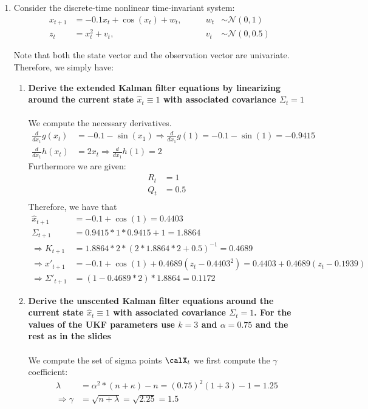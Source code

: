 \documentclass{article}
\begin{document}
\begin{enumerate}
\begin{enumerate}
    \end{enumerate}

  \item  Consider the discrete-time nonlinear time-invariant system:
  \begin{align*}
  x_{t+1} &= -0.1 x_t + \cos(x_t) + w_t, \qquad &w_t& \sim \mathcal{N}(0,1)\\
   z_t &= x_t^2 + v_t, \qquad &v_t& \sim \mathcal{N}(0,0.5)
  \end{align*}
  
  Note that both the state vector and the observation vector are univariate. Therefore, we simply have:
    \begin{enumerate}
      \item \textbf{Derive the extended Kalman filter equations by linearizing around the current state $\hat x_t \equiv 1$ with associated covariance $\Sigma_t = 1$}\\\\
      We compute the necessary derivatives.
      \begin{align*}
       \frac{d}{dx_1} g(x_t) &= -0.1 - \sin(x_1) \Rightarrow \frac{d}{dx_1}g(1) = -0.1 - \sin(1) = -0.9415
       \\
       \frac{d}{dx_1}h(x_t) &=  2x_t \Rightarrow \frac{d}{dx_1}h(1) = 2
      \end{align*}
     Furthermore we are given:
     \begin{align*}
      R_t &= 1 \\
      Q_t &= 0.5 \\
     \end{align*}
     Therefore, we have that
     \begin{align*}
      \hat x_{t+1} &= -0.1+\cos(1) = 0.4403 
      \\
      \Sigma_{t+1} &= 0.9415 * 1 * 0.9415+ 1 = 1.8864
      \\
      \Rightarrow K_{t+1} &= 1.8864* 2 *\left( 2 * 1.8864 * 2 + 0.5\right)^{-1} = 0.4689
      \\
      \Rightarrow x'_{t+1} &= -0.1+\cos(1) + 0.4689(z_t-0.4403^2) = 0.4403 + 0.4689(z_t-0.1939)
      \\
      \Rightarrow \Sigma'_{t+1} &= (1 - 0.4689* 2)* 1.8864 = 0.1172
     \end{align*}

     



      \item \textbf{Derive the unscented Kalman filter equations around the current state $\hat x_t \equiv 1$ with associated covariance $\Sigma_t = 1$. For the values of the UKF parameters use $k= 3$ and $\alpha = 0.75$ and the rest as in the slides} \\\\
      We compute the set of sigma points $\calX_t$
      we first compute the $\gamma$ coefficient:
      \begin{align*}
       \lambda &= \alpha^2*(n+\kappa)-n = (0.75)^2(1+3)-1 = 1.25
       \\
       \Rightarrow \gamma &= \sqrt{n+\lambda} = \sqrt{2.25} = 1.5
      \end{align*}


\end{enumerate}
\end{enumerate}
\end{document}
